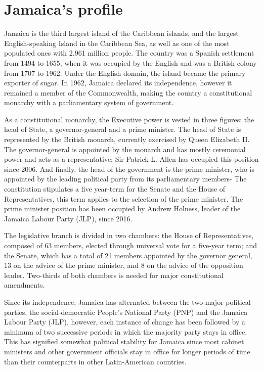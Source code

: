 \documentclass[
  10pt,
]{book}
\begin{document}
\hypertarget{section4}{%
\chapter{Jamaica's profile}\label{section4}}

Jamaica is the third largest island of the Caribbean islands, and the largest English-speaking Island in the Caribbean Sea, as well as one of the most populated ones with 2.961 million people. The country was a Spanish settlement from 1494 to 1655, when it was occupied by the English and was a British colony from 1707 to 1962. Under the English domain, the island became the primary exporter of sugar. In 1962, Jamaica declared its independence, however it remained a member of the Commonwealth, making the country a constitutional monarchy with a parliamentary system of government.

As a constitutional monarchy, the Executive power is vested in three figures: the head of State, a governor-general and a prime minister. The head of State is represented by the British monarch, currently exercised by Queen Elizabeth II. The governor-general is appointed by the monarch and has mostly ceremonial power and acts as a representative; Sir Patrick L. Allen has occupied this position since 2006. And finally, the head of the government is the prime minister, who is appointed by the leading political party from its parliamentary members- The constitution stipulates a five year-term for the Senate and the House of Representatives, this term applies to the selection of the prime minister. The prime minister position has been occupied by Andrew Holness, leader of the Jamaica Labour Party (JLP), since 2016.

The legislative branch is divided in two chambers: the House of Representatives, composed of 63 members, elected through universal vote for a five-year term; and the Senate, which has a total of 21 members appointed by the governor general, 13 on the advice of the prime minister, and 8 on the advice of the opposition leader. Two-thirds of both chambers is needed for major constitutional amendments.

Since its independence, Jamaica has alternated between the two major political parties, the social-democratic People's National Party (PNP) and the Jamaica Labour Party (JLP), however, each instance of change has been followed by a minimum of two successive periods in which the majority party stays in office. This has signified somewhat political stability for Jamaica since most cabinet ministers and other government officials stay in office for longer periods of time than their counterparts in other Latin-American countries.
\end{document}
